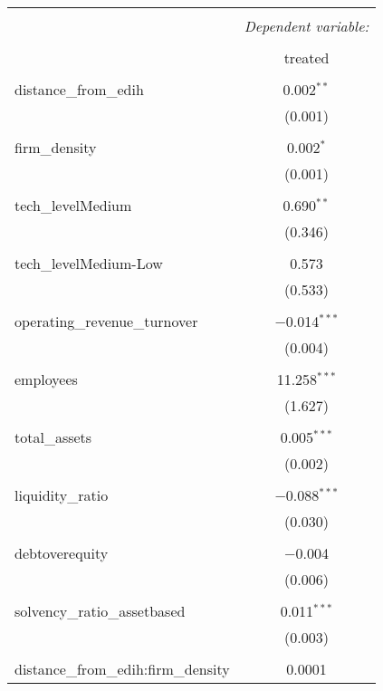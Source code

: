 
\begin{table}[!htbp] \centering 
  \caption{} 
  \label{} 
\begin{tabular}{@{\extracolsep{5pt}}lc} 
\\[-1.8ex]\hline 
\hline \\[-1.8ex] 
 & \multicolumn{1}{c}{\textit{Dependent variable:}} \\ 
\cline{2-2} 
\\[-1.8ex] & treated \\ 
\hline \\[-1.8ex] 
 distance\_from\_edih & 0.002$^{**}$ \\ 
  & (0.001) \\ 
  & \\ 
 firm\_density & 0.002$^{*}$ \\ 
  & (0.001) \\ 
  & \\ 
 tech\_levelMedium & 0.690$^{**}$ \\ 
  & (0.346) \\ 
  & \\ 
 tech\_levelMedium-Low & 0.573 \\ 
  & (0.533) \\ 
  & \\ 
 operating\_revenue\_turnover & $-$0.014$^{***}$ \\ 
  & (0.004) \\ 
  & \\ 
 employees & 11.258$^{***}$ \\ 
  & (1.627) \\ 
  & \\ 
 total\_assets & 0.005$^{***}$ \\ 
  & (0.002) \\ 
  & \\ 
 liquidity\_ratio & $-$0.088$^{***}$ \\ 
  & (0.030) \\ 
  & \\ 
 debtoverequity & $-$0.004 \\ 
  & (0.006) \\ 
  & \\ 
 solvency\_ratio\_assetbased & 0.011$^{***}$ \\ 
  & (0.003) \\ 
  & \\ 
 distance\_from\_edih:firm\_density & 0.0001 \\ 

\end{tabular}
\end{table}
